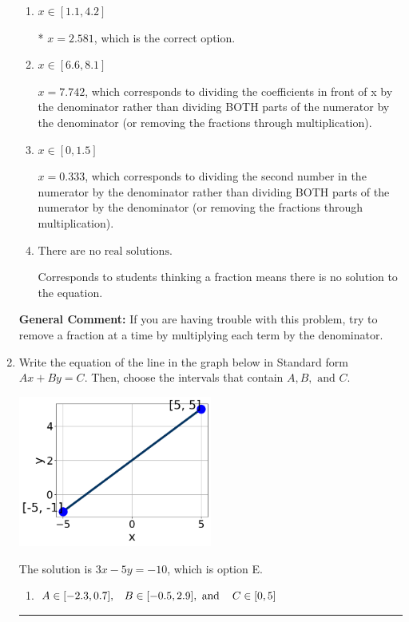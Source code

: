 \documentclass{extbook}[14pt]
\newcommand{\litem}[1]{\item #1

\rule{\textwidth}{0.4pt}}
\begin{document}
\begin{enumerate}
{\begin{enumerate}[label=\Alph*.]
 $x = -1.935$, which corresponds to not distributing the negative in front of the second fraction.
\item \( x \in [1.1, 4.2] \)

* $x = 2.581$, which is the correct option.
\item \( x \in [6.6, 8.1] \)

 $x = 7.742$, which corresponds to dividing the coefficients in front of x by the denominator rather than dividing BOTH parts of the numerator by the denominator (or removing the fractions through multiplication).
\item \( x \in [0, 1.5] \)

 $x = 0.333$, which corresponds to dividing the second number in the numerator by the denominator rather than dividing BOTH parts of the numerator by the denominator (or removing the fractions through multiplication).
\item \( \text{There are no real solutions.} \)

Corresponds to students thinking a fraction means there is no solution to the equation.
\end{enumerate}

\textbf{General Comment:} If you are having trouble with this problem, try to remove a fraction at a time by multiplying each term by the denominator.
}
\litem{
Write the equation of the line in the graph below in Standard form $Ax+By=C$. Then, choose the intervals that contain $A, B, \text{ and } C$.

\begin{center}
    \includegraphics[width=0.5\textwidth]{../Figures/linearGraphToStandardCopyA.png}
\end{center}



The solution is \( 3x - 5y = -10 \), which is option E.\begin{enumerate}[label=\Alph*.]
\item \( A \in [-2.3, 0.7], \hspace{3mm} B \in [-0.5, 2.9], \text{ and } \hspace{3mm} C \in [0, 5] \)


\end{enumerate}}
\end{enumerate}
\end{document}
